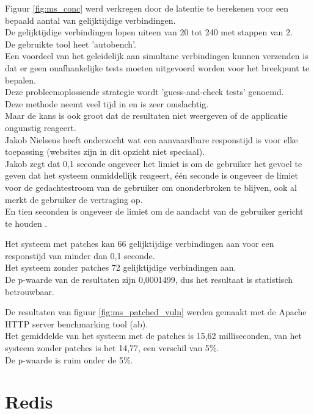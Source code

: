 Figuur \ref{fig:ms_conc} werd verkregen door de latentie te berekenen voor een bepaald aantal van gelijktijdige verbindingen.\\
De gelijktijdige verbindingen lopen uiteen van 20 tot 240 met stappen van 2.\\ 
De gebruikte tool heet 'autobench'.\\
Een voordeel van het geleidelijk aan simultane verbindingen kunnen verzenden is dat er geen onafhankelijke tests moeten uitgevoerd worden voor het breekpunt te bepalen.\\
Deze probleemoplossende strategie wordt 'guess-and-check tests' genoemd.\\
Deze methode neemt veel tijd in en is zeer omslachtig.\\
Maar de kans is ook groot dat de resultaten niet weergeven of de applicatie ongunstig reageert.\\

Jakob Nielsens heeft onderzocht wat een aanvaardbare responstijd is voor elke toepassing (websites zijn in dit opzicht niet speciaal).\\
Jakob zegt dat 0,1 seconde ongeveer het limiet is om de gebruiker het gevoel te geven dat het systeem onmiddellijk reageert, één seconde is ongeveer de limiet voor de gedachtestroom van de gebruiker om ononderbroken te blijven, ook al merkt de gebruiker de vertraging op.\\
En tien seconden is ongeveer de limiet om de aandacht van de gebruiker gericht te houden \parencite{Nielsen1993}.

Het systeem met patches kan 66 gelijktijdige verbindingen aan voor een responstijd van minder dan 0,1 seconde.\\
Het systeem zonder patches 72 gelijktijdige verbindingen aan.\\
De p-waarde van de resultaten zijn 0,0001499, dus het resultaat is statistisch betrouwbaar.


De resultaten van figuur \ref{fig:ms_patched_vuln} werden gemaakt met de Apache HTTP server benchmarking tool (ab).\\
Het gemiddelde van het systeem met de patches is 15,62 milliseconden, van het systeem zonder patches is het 14,77, een verschil van 5\%.\\
De p-waarde is ruim onder de 5\%.


\section{Redis}

